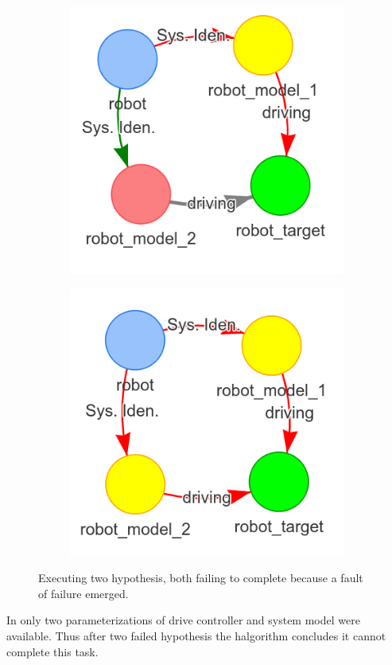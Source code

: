 \begin{figure}[H]
\begin{subfigure}{.3\textwidth}
    \end{subfigure}
    \begin{subfigure}{.3\textwidth}
    \centering
    \includegraphics[width=1\textwidth]{figures/connecting_nodes/failure/fail_6}
    \end{subfigure}

    \begin{subfigure}{.3\textwidth}
    \centering
    \includegraphics[width=1\textwidth]{figures/connecting_nodes/failure/fail_7}
    \end{subfigure}
    \hfill
    \caption{Executing two hypothesis, both failing to complete because a fault of failure emerged.}%
    \label{fig:failure_in_hgraph}
\end{figure}

In  only two parameterizations of drive controller and system model were available. Thus after two failed hypothesis the \ac{halgorithm} concludes it cannot complete this task.\bs
